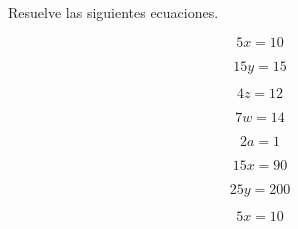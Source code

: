 \documentclass[11pt]{article}
\begin{document}
\vspace{7mm}
\setcounter{equation}{0}
Resuelve las siguientes ecuaciones.

\vspace{-5mm}
\begin{multicols}{2}

\begin{equation}    5x = 10     \end{equation}

\vspace{7mm}
\begin{equation}    15y = 15    \end{equation}

\vspace{7mm}
\begin{equation}    4z = 12     \end{equation}

\vspace{7mm}
\begin{equation}    7w = 14     \end{equation}

\vspace{7mm}
\begin{equation}    2a = 1      \end{equation}

\vspace{7mm}
\begin{equation}    15x = 90    \end{equation}

\vspace{7mm}
\begin{equation}    25y = 200   \end{equation}

\vspace{7mm}
\begin{equation}    5x = 10     \end{equation}

\vspace{7mm}
\end{multicols}
\end{document}
